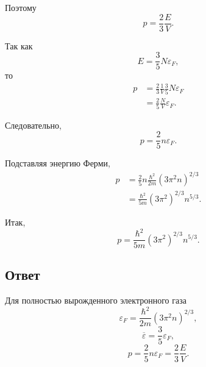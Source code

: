 \documentclass[../final.tex]{subfiles}
\begin{document}
Поэтому
%
\begin{equation*}
    \boxed{
        p
        =
        \frac{2}{3}
        \frac{E}{V}
    }.
\end{equation*}

Так как
%
\begin{equation*}
    E
    =
    \frac{3}{5}
    N\varepsilon_F,
\end{equation*}
%
то
%
\begin{align*}
    p
    &=
    \frac{2}{3}
    \frac{1}{V}
    \frac{3}{5}
    N\varepsilon_F
    \\[3pt]
    &=
    \frac{2}{5}
    \frac{N}{V}
    \varepsilon_F.
\end{align*}

Следовательно,
%
\begin{equation*}
    \boxed{
        p
        =
        \frac{2}{5}
        n\varepsilon_F
    }.
\end{equation*}

Подставляя энергию Ферми,
%
\begin{align*}
    p
    &=
    \frac{2}{5}
    n
    \frac{
        \hbar^2
    }{
        2m
    }
    (3\pi^2n)^{2/3}
    \\[3pt]
    &=
    \frac{
        \hbar^2
    }{
        5m
    }
    (3\pi^2)^{2/3}
    n^{5/3}.
\end{align*}

Итак,
%
\begin{equation*}
    \boxed{
        p
        =
        \frac{
            \hbar^2
        }{
            5m
        }
        (3\pi^2)^{2/3}
        n^{5/3}
    }.
\end{equation*}



\subsection*{Ответ}

Для полностью вырожденного электронного газа
%
\begin{equation*}
    \boxed{
        \varepsilon_F
        =
        \frac{
            \hbar^2
        }{
            2m
        }
        (3\pi^2n)^{2/3}
    },
\end{equation*}
%
%
\begin{equation*}
    \boxed{
        \overline{\varepsilon}
        =
        \frac{3}{5}
        \varepsilon_F
    },
\end{equation*}
%
%
\begin{equation*}
    \boxed{
        p
        =
        \frac{2}{5}
        n\varepsilon_F
        =
        \frac{2}{3}
        \frac{E}{V}
    }.
\end{equation*}
\end{document}
